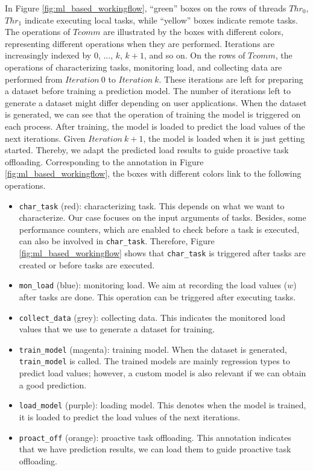 In Figure \ref{fig:ml_based_workingflow}, ``green'' boxes on the rows of threads $Thr_{0}$, $Thr_{1}$ indicate executing local tasks, while ``yellow'' boxes indicate remote tasks. The operations of $Tcomm$ are illustrated by the boxes with different colors, representing different operations when they are performed. Iterations are increasingly indexed by $0$, ..., $k$, $k+1$, and so on. On the rows of $Tcomm$, the operations of characterizing tasks, monitoring load, and collecting data are performed from $Iteration\ 0$ to $Iteration\ k$. These iterations are left for preparing a dataset before training a prediction model. The number of iterations left to generate a dataset might differ depending on user applications. When the dataset is generated, we can see that the operation of training the model is triggered on each process. After training, the model is loaded to predict the load values of the next iterations. Given $Iteration\ k+1$, the model is loaded when it is just getting started. Thereby, we adapt the predicted load results to guide proactive task offloading. Corresponding to the annotation in Figure \ref{fig:ml_based_workingflow}, the boxes with different colors link to the following operations.

\begin{itemize}
	\item \texttt{char\_task} (red): characterizing task. This depends on what we want to characterize. Our case focuses on the input arguments of tasks. Besides, some performance counters, which are enabled to check before a task is executed, can also be involved in \texttt{char\_task}. Therefore, Figure \ref{fig:ml_based_workingflow} shows that \texttt{char\_task} is triggered after tasks are created or before tasks are executed.
	\item \texttt{mon\_load} (blue): monitoring load. We aim at recording the load values ($w$) after tasks are done. This operation can be triggered after executing tasks.
	\item \texttt{collect\_data} (grey): collecting data. This indicates the monitored load values that we use to generate a dataset for training.
	\item \texttt{train\_model} (magenta): training model. When the dataset is generated, \texttt{train\_model} is called. The trained models are mainly regression types to predict load values; however, a custom model is also relevant if we can obtain a good prediction.
	\item \texttt{load\_model} (purple): loading model. This denotes when the model is trained, it is loaded to predict the load values of the next iterations.
	\item \texttt{proact\_off} (orange): proactive task offloading. This annotation indicates that we have prediction results, we can load them to guide proactive task offloading.
\end{itemize}

